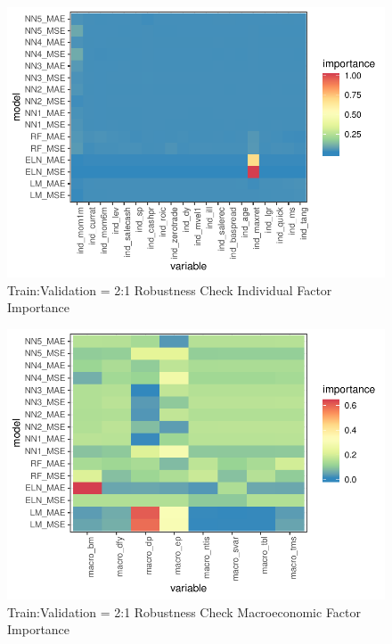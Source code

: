 \documentclass{article}
\begin{document}



\FloatBarrier


\begin{figure}
	\includegraphics[]{../../Results/empirical_train_valid_2/empirical_all_sample_vi_ind.pdf}
	\caption{Train:Validation = 2:1 Robustness Check Individual Factor Importance}
\end{figure}

\begin{figure}
	\includegraphics[]{../../Results/empirical_train_valid_2/empirical_sample_all_vi_macro.pdf}
	\caption{Train:Validation = 2:1 Robustness Check Macroeconomic Factor Importance}
\end{figure}
\end{document}

